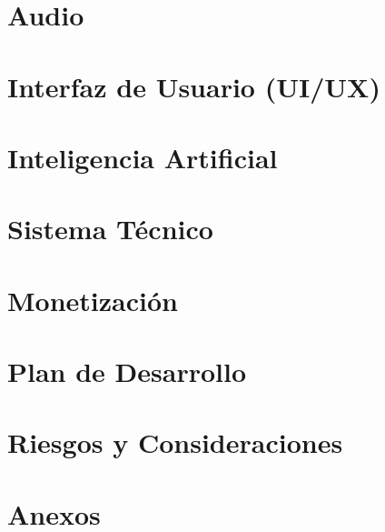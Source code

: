 \documentclass[a4paper,12pt]{article}
\begin{document}
\section{Audio}




\section{Interfaz de Usuario (UI/UX)}




\section{Inteligencia Artificial}




\section{Sistema Técnico}




\section{Monetización}


\section{Plan de Desarrollo}



\section{Riesgos y Consideraciones}



\section{Anexos}




\end{document}
